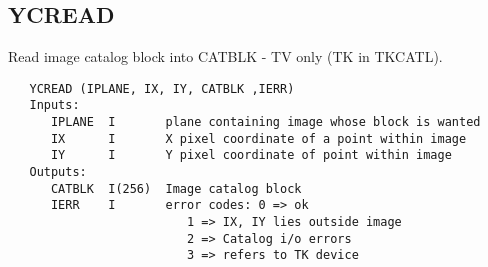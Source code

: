 \subsection{YCREAD}
Read image catalog block into CATBLK - TV only (TK in TKCATL).
\begin{verbatim}
   YCREAD (IPLANE, IX, IY, CATBLK ,IERR)
   Inputs:
      IPLANE  I       plane containing image whose block is wanted
      IX      I       X pixel coordinate of a point within image
      IY      I       Y pixel coordinate of point within image
   Outputs:
      CATBLK  I(256)  Image catalog block
      IERR    I       error codes: 0 => ok
                         1 => IX, IY lies outside image
                         2 => Catalog i/o errors
                         3 => refers to TK device

\end{verbatim}



